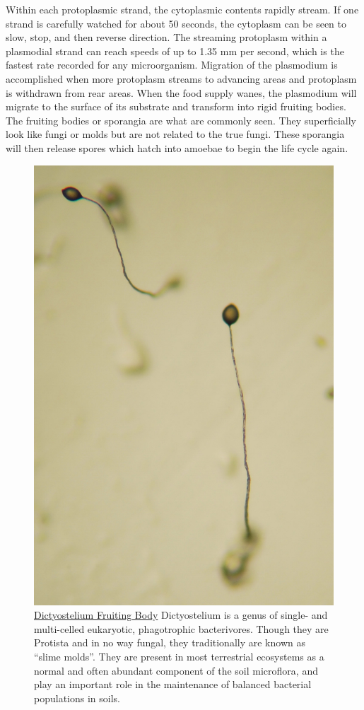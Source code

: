 Within each protoplasmic strand, the cytoplasmic contents rapidly stream. If one strand is carefully watched for about 50 seconds, the cytoplasm can be seen to slow, stop, and then reverse direction. The streaming protoplasm within a plasmodial strand can reach speeds of up to 1.35 mm per second, which is the fastest rate recorded for any microorganism. Migration of the plasmodium is accomplished when more protoplasm streams to advancing areas and protoplasm is withdrawn from rear areas. When the food supply wanes, the plasmodium will migrate to the surface of its substrate and transform into rigid fruiting bodies. The fruiting bodies or sporangia are what are commonly seen. They superficially look like fungi or molds but are not related to the true fungi. These sporangia will then release spores which hatch into amoebae to begin the life cycle again.



\begin{figure}

{\centering \includegraphics[width=0.7\linewidth]{./figures/protista/Dictyostelium_Fruiting_Bodies} 

}

\caption{\href{https://commons.wikimedia.org/wiki/File:Dictyostelium_Fruiting_Bodies.JPG}{Dictyostelium Fruiting Body} Dictyostelium is a genus of single- and multi-celled eukaryotic, phagotrophic bacterivores. Though they are Protista and in no way fungal, they traditionally are known as ``slime molds''. They are present in most terrestrial ecosystems as a normal and often abundant component of the soil microflora, and play an important role in the maintenance of balanced bacterial populations in soils.}\label{fig:dictfruiting}
\end{figure}



